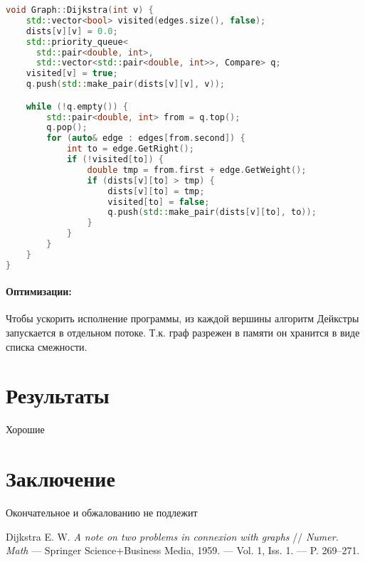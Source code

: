 \documentclass[12pt]{article}
\begin{document}

\begin{lstlisting}[language=C++]
void Graph::Dijkstra(int v) {
    std::vector<bool> visited(edges.size(), false);
    dists[v][v] = 0.0;
    std::priority_queue<
      std::pair<double, int>,
      std::vector<std::pair<double, int>>, Compare> q;
    visited[v] = true;
    q.push(std::make_pair(dists[v][v], v));

    while (!q.empty()) {
        std::pair<double, int> from = q.top();
        q.pop();
        for (auto& edge : edges[from.second]) {
            int to = edge.GetRight();
            if (!visited[to]) {
                double tmp = from.first + edge.GetWeight();
                if (dists[v][to] > tmp) {
                    dists[v][to] = tmp;
                    visited[to] = false;
                    q.push(std::make_pair(dists[v][to], to));
                }
            }
        }
    }
}
\end{lstlisting}

\paragraph{Оптимизации:}
Чтобы ускорить исполнение программы, из каждой
вершины алгоритм Дейкстры запускается в отдельном
потоке. Т.к. граф разрежен в памяти он хранится в
виде списка смежности.

\section{Результаты}
Хорошие

\section{Заключение}
Окончательное и обжалованию не подлежит

\begin{thebibliography}{9}
Dijkstra E. W. \textit{A note on two problems in connexion with graphs} //
\textit{Numer. Math} — Springer Science+Business Media, 1959.
— Vol. 1, Iss. 1. — P. 269–271.
\end{thebibliography}
\end{document}
